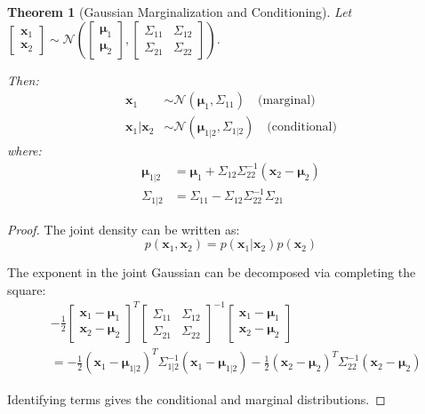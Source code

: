 \documentclass[11pt]{article}
\newtheorem{theorem}{Theorem}[section]
\begin{document}
\begin{theorem}[Gaussian Marginalization and Conditioning]
Let $\begin{bmatrix} \mathbf{x}_1 \\ \mathbf{x}_2 \end{bmatrix} \sim \mathcal{N}\left(\begin{bmatrix} \bm{\mu}_1 \\ \bm{\mu}_2 \end{bmatrix}, \begin{bmatrix} \Sigma_{11} & \Sigma_{12} \\ \Sigma_{21} & \Sigma_{22} \end{bmatrix}\right)$.

Then:
\begin{align}
\mathbf{x}_1 &\sim \mathcal{N}(\bm{\mu}_1, \Sigma_{11}) \quad \text{(marginal)} \\
\mathbf{x}_1 | \mathbf{x}_2 &\sim \mathcal{N}(\bm{\mu}_{1|2}, \Sigma_{1|2}) \quad \text{(conditional)}
\end{align}
where:
\begin{align}
\bm{\mu}_{1|2} &= \bm{\mu}_1 + \Sigma_{12}\Sigma_{22}^{-1}(\mathbf{x}_2 - \bm{\mu}_2) \\
\Sigma_{1|2} &= \Sigma_{11} - \Sigma_{12}\Sigma_{22}^{-1}\Sigma_{21}
\end{align}
\end{theorem}

\begin{proof}
The joint density can be written as:
\begin{equation}
p(\mathbf{x}_1, \mathbf{x}_2) = p(\mathbf{x}_1|\mathbf{x}_2)p(\mathbf{x}_2)
\end{equation}

The exponent in the joint Gaussian can be decomposed via completing the square:
\begin{align}
&-\frac{1}{2}\begin{bmatrix} \mathbf{x}_1 - \bm{\mu}_1 \\ \mathbf{x}_2 - \bm{\mu}_2 \end{bmatrix}^T \begin{bmatrix} \Sigma_{11} & \Sigma_{12} \\ \Sigma_{21} & \Sigma_{22} \end{bmatrix}^{-1} \begin{bmatrix} \mathbf{x}_1 - \bm{\mu}_1 \\ \mathbf{x}_2 - \bm{\mu}_2 \end{bmatrix} \\
&= -\frac{1}{2}(\mathbf{x}_1 - \bm{\mu}_{1|2})^T \Sigma_{1|2}^{-1} (\mathbf{x}_1 - \bm{\mu}_{1|2}) - \frac{1}{2}(\mathbf{x}_2 - \bm{\mu}_2)^T \Sigma_{22}^{-1} (\mathbf{x}_2 - \bm{\mu}_2)
\end{align}

Identifying terms gives the conditional and marginal distributions.
\end{proof}
\end{document}
